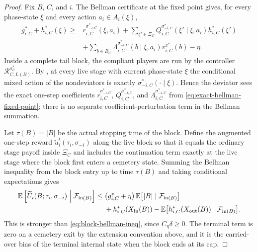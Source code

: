 \documentclass[12pt]{article}
\theoremstyle{definition}
\newcommand{\E}{\mathbb{E}}
\newcommand{\1}{\mathbf{1}}
\newcommand{\cF}{\mathcal{F}}
\begin{document}
\begin{proof}
Fix $B$, $C$, and $i$. The Bellman certificate at the fixed point gives, for every
phase-state $\xi$ and every action $a_i\in A_i(\xi)$,
\begin{align}
\label{eq:exact-bellman-fixed-point}
g_{i,C}^* + h_{i,C}^*(\xi)
\ge {}
&r_{i,C}^{\sigma_{-i,C}^*}(\xi,a_i)
+
\sum_{\xi'\in\Xi_C}Q_{i,C}^{\sigma_{-i,C}^*}(\xi'\mid\xi,a_i)h_{i,C}^*(\xi')
\\
&+
\sum_{b\in B_C}\Lambda_{i,C}^{\sigma_{-i,C}^*}(b\mid\xi,a_i)v_{i,C}^{x^*}(b)
-\eta.
\nonumber
\end{align}
Inside a complete tail block, the compliant players are run by the controller
$\mathcal R_{C,L(B)}^{\sigma_C^*}$. By , at every live
stage with current phase-state $\xi$ the conditional mixed action of the
nondeviators is exactly $\sigma_{-i,C}^*(\cdot\mid\xi)$. Hence the deviator sees
the exact one-step coefficients
$r_{i,C}^{\sigma_{-i,C}^*}$, $Q_{i,C}^{\sigma_{-i,C}^*}$, and
$\Lambda_{i,C}^{\sigma_{-i,C}^*}$ from
\eqref{eq:exact-bellman-fixed-point}; there is no separate coefficient-perturbation
term in the Bellman summation.

Let $\tau(B)=|B|$ be the actual stopping time of the block. Define the augmented
one-step reward $\widetilde u_i^t(\tau_i,\sigma_{-i})$ along the live block so that
it equals the ordinary stage payoff inside $\Xi_C$ and includes the continuation
term exactly at the live stage where the block first enters a cemetery state.
Summing the Bellman inequality from the block entry up to time $\tau(B)$ and
taking conditional expectations gives
\begin{align*}
\E\left[\widetilde U_i(B;\tau_i,\sigma_{-i})\Bigm|\cF_{\mathrm{in}(B)}\right]
\le{}&
\bigl(g_{i,C}^*+\eta\bigr)\,
\E\bigl[|B|\mid\cF_{\mathrm{in}(B)}\bigr]
\\
&+
h_{i,C}^*(X_{\mathrm{in}}(B))
-
\E\bigl[h_{i,C}^*(X_{\mathrm{out}}(B))\mid\cF_{\mathrm{in}(B)}\bigr].
\end{align*}
This is stronger than \eqref{eq:block-bellman-ineq}, since $C_\eta\delta\ge 0$.
The terminal term is zero on a cemetery exit by the extension convention above,
and it is the carried-over bias of the terminal internal state when the block ends
at its cap.
\end{proof}
\end{document}
